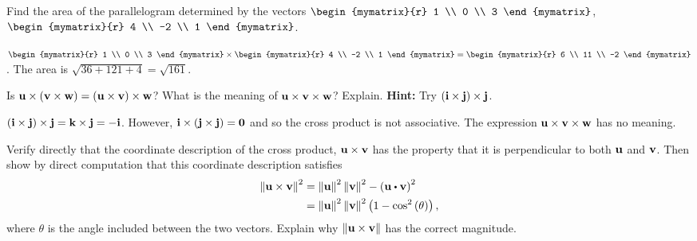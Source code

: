 \begin{enumialphparenastyle}
\begin{ex}
  Find the area of the parallelogram determined by the vectors
  $\begin{mymatrix}{r}
    1 \\
    0 \\
    3
  \end{mymatrix}$, $\begin{mymatrix}{r}
    4 \\
    -2 \\
    1
  \end{mymatrix}$.
  \begin{sol}
    $\begin{mymatrix}{r}
      1 \\
      0 \\
      3
    \end{mymatrix} \times
    \begin{mymatrix}{r}
      4 \\
      -2 \\
      1
    \end{mymatrix} =\begin{mymatrix}{r}
      6 \\
      11 \\
      -2
    \end{mymatrix}$. The area is $\sqrt{36+121+4}= \sqrt{161}$.
  \end{sol}
\end{ex}


\begin{ex}
  Is
  $\mbox{\bf u}\times \left(\mbox{\bf v}\times\mbox{\bf w}\right) = \left(\mbox{\bf u}\times
    \mbox{\bf v}\right)\times\mbox{\bf w}$? What is the meaning of
  $\mbox{\bf u}\times \mbox{\bf v}\times\mbox{\bf w}$? Explain.  \textbf{Hint:}
  Try $\left(\mbox{\bf i}\times\mbox{\bf j}\right)\times\mbox{\bf j}$.
  \begin{sol}
    $\left(\mbox{\bf i}\times\mbox{\bf j}\right)\times\mbox{\bf j} = \mbox{\bf k}\times
    \mbox{\bf j}=-\mbox{\bf i}$. However,
    $\mbox{\bf i}\times\left(\mbox{\bf j}\times\mbox{\bf j}\right) = \mbox{\bf 0}$ and so
    the cross product is not associative. The expression
    $\mbox{\bf u}\times\mbox{\bf v}\times\mbox{\bf w}$ has no meaning.
  \end{sol}
\end{ex}

\begin{ex}
  Verify directly that the coordinate description of the cross
  product, $\mbox{\bf u}\times \mbox{\bf v}$ has the property that it is
  perpendicular to both $\mbox{\bf u}$ and $\mbox{\bf v}$. Then show by direct
  computation that this coordinate description satisfies
  \begin{align*}
    \norm{\vect{u}\times \vect{v}} ^{2}
    & =\norm{\vect{u}
      } ^{2}\norm{\vect{v}} ^{2}-\tup{\vect{u}\dotprod \vect{v}} ^{2} \\
    & =\norm{\vect{u}} ^{2}\norm{\vect{v}}
      ^{2}\tup{1-\cos ^{2}\tup{\theta } },
  \end{align*}
  where $\theta$ is the angle included between the two
  vectors. Explain why $\left\|\mbox{\bf u}\times\mbox{\bf v}\right\|$ has the
  correct magnitude.
\end{ex}


\end{enumialphparenastyle}
